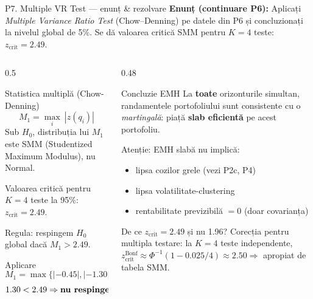\documentclass[9pt, aspectratio=169, t]{beamer}
\begin{document}
\begin{frame}[shrink=30]{P7. Multiple VR Test --- enunț \& rezolvare}
\textbf{Enunț (continuare P6):} Aplicați \emph{Multiple Variance Ratio Test} (Chow--Denning) pe datele din P6 și concluzionați la nivelul global de 5\%. Se dă valoarea critică SMM pentru $K=4$ teste: $z_{\text{crit}}=2.49$.
\vspace{0.2em}
\begin{columns}[T]
\begin{column}{0.5\textwidth}
\begin{block}{Statistica multiplă (Chow-Denning)}
\[
M_1 = \max_{i}\ |z(q_i)|
\]
Sub $H_0$, distribuția lui $M_1$ este SMM (Studentized Maximum Modulus), nu Normal.

Valoarea critică pentru $K=4$ teste la 95\%: $z_{\text{crit}}=2.49$.

Regula: respingem $H_0$ global dacă $M_1>2.49$.
\end{block}
\begin{block}{Aplicare}
\[
M_1 = \max\{|-0.45|,|-1.30|,|-0.85|,|-0.55|\} = 1.30
\]
\[
1.30 < 2.49 \Rightarrow \text{\textbf{nu respingem} } H_0
\]
\end{block}
\end{column}
\begin{column}{0.48\textwidth}
\begin{alertblock}{Concluzie EMH}
La \textbf{toate} orizonturile simultan, randamentele portofoliului sunt consistente cu o \emph{martingală}: piață \textbf{slab eficientă} pe acest portofoliu.

Atenție: EMH slabă nu implică:
\begin{itemize}\setlength{\itemsep}{0pt}
    \item lipsa cozilor grele (vezi P2c, P4)
    \item lipsa volatilitate-clustering
    \item rentabilitate previzibilă $=0$ (doar covarianța)
\end{itemize}
\end{alertblock}
\begin{exampleblock}{De ce $z_{\text{crit}}=2.49$ și nu 1.96?}
Corecția pentru multipla testare: la $K=4$ teste independente, $z_{\text{crit}}^{\text{Bonf}}\approx \Phi^{-1}(1-0.025/4)\approx 2.50 \Rightarrow$ apropiat de tabela SMM.
\end{exampleblock}
\end{column}
\end{columns}
\end{frame}
\end{document}
